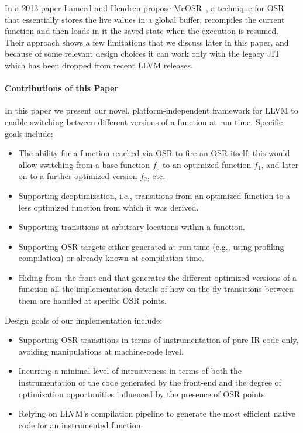 In a 2013 paper Lameed and Hendren propose McOSR~\cite{lameed2013modular}, a technique for OSR that essentially stores the live values in a global buffer, recompiles the current function and then loads in it the saved state when the execution is resumed. Their approach shows a few limitations that we discuss later in this paper, and because of some relevant design choices it can work only with the legacy JIT which has been dropped from recent LLVM releases.

\paragraph{Contributions of this Paper}
In this paper we present our novel, platform-independent framework for LLVM to enable switching between different versions of a function at run-time. Specific goals include:
\begin{itemize}
\item The ability for a function reached via OSR to fire an OSR itself: this would allow switching from a base function $f_0$ to an optimized function $f_1$, and later on to a further optimized version $f_2$, etc.
\item Supporting deoptimization, i.e., transitions from an optimized function to a less optimized function from which it was derived.
\item Supporting transitions at arbitrary locations within a function.
\item Supporting OSR targets either generated at run-time (e.g., using profiling compilation) or already known at compilation time.
\item Hiding from the front-end that generates the different optimized versions of a function all the implementation details of how on-the-fly transitions between them are handled at specific OSR points.
\end{itemize}

Design goals of our implementation include:
\begin{itemize}
\item Supporting OSR transitions in terms of instrumentation of pure IR code only, avoiding manipulations at machine-code level.
\item Incurring a minimal level of intrusiveness in terms of both the instrumentation of the code generated by the front-end and the degree of optimization opportunities influenced by the presence of OSR points.
\item Relying on LLVM's compilation pipeline to generate the most efficient native code for an instrumented function.
\end{itemize}


